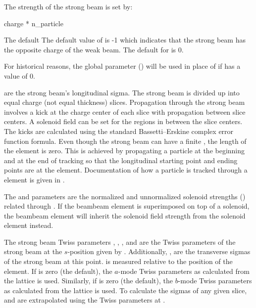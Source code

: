 The strength of the strong beam is set by:
\begin{example}
  charge * n_particle
\end{example}
The default The default value of  is -1 which indicates that the strong beam has the
opposite charge of the weak beam. The default for  is 0.

For historical reasons, the global parameter  () will be used in
place of  if  has a value of 0.

 are the strong beam's longitudinal sigma.  The strong beam is divided up into
 equal charge (not equal thickness) slices. Propagation through the strong beam involves
a kick at the charge center of each slice with propagation between slice centers. A solenoid field
can be set for the regions in between the slice centers. The kicks are calculated using the standard
Bassetti--Erskine complex error function formula\cite{b:talman}. Even though the strong beam can
have a finite , the length of the  element is zero. This is achieved by
propagating a particle at the beginning and at the end of tracking so that the longitudinal starting
point and ending points are at the  element. Documentation of how a particle is tracked
through a  element is given in .

The  and  parameters are the normalized and unnormalized solenoid strengths
() related through . If the beambeam element is superimposed on top
of a solenoid, the beambeam element will inherit the solenoid field strength from the solenoid
element instead.

The strong beam Twiss parameters , , , and
 are the Twiss parameters of the strong beam at the $s$-position given by
. Additionally, ,  are the transverse sigmas of the strong beam
at this point.  is measured relative to the position of the element.  If
 is zero (the default), the $a$-mode Twiss parameters as calculated from the
lattice is used. Similarly, if  is zero (the default), the $b$-mode Twiss
parameters as calculated from the lattice is used.  To calculate the sigmas of any given slice,
 and  are extrapolated using the Twiss parameters at .

